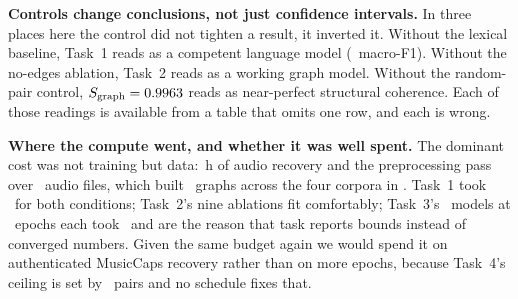\documentclass[10pt,a4paper]{article}
\begin{document}
\textbf{Controls change conclusions, not just confidence intervals.} In three
places here the control did not tighten a result, it inverted it. Without the
lexical baseline, Task~1 reads as a competent language model
(\tOneBertRawMacroFOne\ macro-F1). Without the no-edges ablation, Task~2 reads as
a working graph model. Without the random-pair control, $S_{\text{graph}} =
0.9963$ reads as near-perfect structural coherence. Each of those
readings is available from a table that omits one row, and each is wrong.

\textbf{Where the compute went, and whether it was well spent.} The dominant cost
was not training but data: \mcDownloadHours\,h of audio recovery and the
preprocessing pass over \prepFiles\ audio files, which built \prepGraphs\ graphs
across the four corpora in \prepWall. Task~1 took \tOneWall\ for both
conditions; Task~2's nine ablations fit comfortably; Task~3's \tThreeNModes\ models at
\tThreeRunEpochs\ epochs each took \tThreeWall\ and are the reason that task reports
bounds instead of converged numbers.
Given the same budget again we would spend it on authenticated MusicCaps recovery
rather than on more epochs, because Task~4's ceiling is set by
\tFourNTrain\ pairs and no schedule fixes that.

\end{document}
